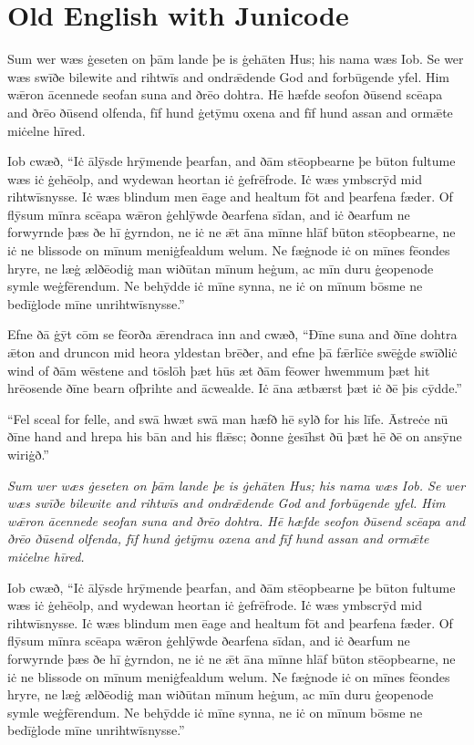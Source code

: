 \documentclass[letterpaper]{article}
\begin{document}
\section*{Old English with Junicode}

\linespread{1.1}\Large Sum wer wæs ġeseten on þām lande þe is ġehāten Hus; his nama wæs Iob.  Se wer wæs swīðe bilewite and rihtwīs and ondrǣdende God and forbūgende yfel.  Him wǣron ācennede \mbox{seofan} suna and ðrēo dohtra.  Hē hæfde seofon ðūsend scēapa and ðrēo ðūsend olfenda, fīf hund ġetȳmu oxena and fīf hund assan and ormǣte miċelne hīred.

Iob cwæð, “Iċ ālȳsde hrȳmende þearfan, and ðām stēopbearne þe būton fultume wæs iċ ġehēolp, and wydewan \mbox{heortan} iċ ġefrēfrode.  Iċ wæs ymbscrȳd mid rihtwīsnysse.  Iċ wæs blind\-um men ēage and healtum fōt and þearfena fæder.  Of flȳsum mīnra scēapa wǣron ġehlȳwde ðearfena sīdan, and iċ ðearfum ne forwyrnde þæs ðe hī ġyrndon, ne iċ ne ǣt āna mīnne hlāf būton stēopbearne, ne iċ ne blissode on mīnum meniġfealdum welum.  Ne fæġnode iċ on mīnes fēondes hryre, ne læġ ælðēodiġ man wiðūtan mīnum heġum, ac mīn duru ġeopenode symle weġfērendum.  Ne behȳdde iċ mīne synna, ne iċ on mīnum bōsme ne bedīġlode mīne unrihtwīsnysse.”

Efne ðā ġȳt cōm se fēorða ǣrendraca inn and cwæð, “Ðīne suna and ðīne dohtra ǣton and druncon mid heora yldestan brēðer, and efne þā fǣrlīċe swēġde swīðliċ wind of ðām wēstene and tōslōh þæt hūs æt ðām fēower hwemmum þæt hit hrēosende ðīne bearn ofþrihte and ācwealde. Iċ āna ætbærst þæt iċ ðē þis cȳdde.”

“Fel sceal for felle, and swā hwæt swā man hæfð hē sylð for his līfe.  Āstreċe nū ðīne hand and hrepa his bān and his flǣsc; ðonne ġesīhst ðū þæt hē ðē on ansȳne wiriġð.”

\pagebreak

\itshape\noindent Sum wer wæs ġeseten on þām lande þe is ġehāten Hus; his nama wæs Iob.  Se wer wæs swīðe bilewite and rihtwīs and ondrǣdende God and forbūgende yfel.  Him wǣron ācennede \mbox{seofan} suna and ðrēo dohtra.  Hē hæfde seofon ðūsend scēapa and ðrēo ðūsend olfenda, fīf hund ġetȳmu oxena and fīf hund assan and ormǣte miċelne hīred.

Iob cwæð, “Iċ ālȳsde hrȳmende þearfan, and ðām stēopbearne þe būton fultume wæs iċ ġehēolp, and wydewan \mbox{heortan} iċ ġefrēfrode.  Iċ wæs ymbscrȳd mid rihtwīsnysse.  Iċ wæs blind\-um men ēage and healtum fōt and þearfena fæder.  Of flȳsum mīnra scēapa wǣron ġehlȳwde ðearfena sīdan, and iċ ðearfum ne forwyrnde þæs ðe hī ġyrndon, ne iċ ne ǣt āna mīnne hlāf būton stēopbearne, ne iċ ne blissode on mīnum meniġfealdum welum.  Ne fæġnode iċ on mīnes fēondes hryre, ne læġ ælðēodiġ man wiðūtan mīnum heġum, ac mīn duru ġeopenode symle weġfērendum.  Ne behȳdde iċ mīne synna, ne iċ on mīnum bōsme ne bedīġlode mīne unrihtwīsnysse.”
\end{document}
